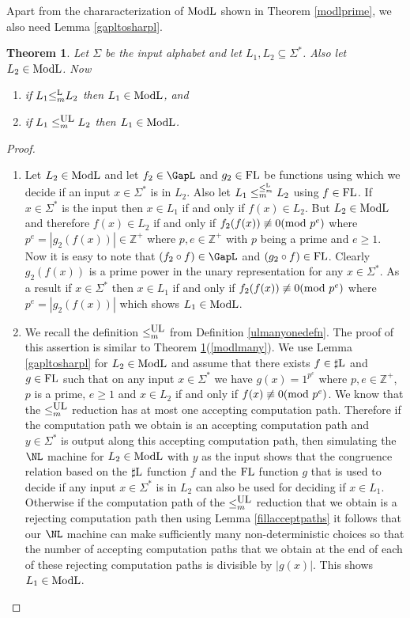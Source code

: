 \documentclass{amsbook}
\newtheorem{theorem}{Theorem}[chapter]
\theoremstyle{definition}
\theoremstyle{remark}
\numberwithin{section}{chapter}
\numberwithin{equation}{chapter}
\newcommand{\Lredn}{\leq^{\small{\rm L}}_m}
\newcommand{\ULredn}{\mbox{\small{\rm UL}}}
\newcommand{\sharpL}{\mbox{$\sharp$\rm L}}
\newcommand{\ModL}{\mbox{\rm ModL}}
\newcommand{\FL}{\mbox{\rm FL}}
\renewcommand{\mod}{\mbox{\textrm mod~}}
\newcommand{\Z}{\mathbb{Z}}
\begin{document}
Apart from the chararacterization of $\ModL$ shown in Theorem \ref{modlprime}, we also need Lemma \ref{gapltosharpl}.

\begin{theorem}\label{modlunconclos}
Let $\Sigma$ be the input alphabet and let $L_1,L_2\subseteq \Sigma ^{*}$. Also let $L_2\in\ModL$. Now 
\begin{enumerate}
\item\label{modlmany} if $L_1{\Lredn} L_2$ then $L_1\in\ModL$, and
\item\label{modlulmany} if $L_1\leq^{\ULredn}_mL_2$ then $L_1\in\ModL$.
\end{enumerate}
\end{theorem}
\begin{proof}
\begin{enumerate}
\item Let $L_2\in\ModL$ and let $f_2\in\GapL$ and $g_2\in\FL$ be functions using which we decide if an input $x\in\Sigma ^{*}$ is in $L_2$. Also let $L_1\leq ^{\Lredn}_mL_2$ using $f\in\FL$. If $x\in\Sigma^{*}$ is the input then $x\in L_1$ if and only if $f(x)\in L_2$. But $L_2\in\ModL$ and therefore $f(x)\in L_2$ if and only if $f_2(f(x))\not\equiv 0(\mod p^e)$ where $p^e=|g_2(f(x))|\in\Z^{+}$ where $p,e\in\Z^{+}$ with $p$ being a prime and $e\geq 1$. Now it is easy to note that $(f_2\circ f)\in\GapL$ and $(g_2\circ f)\in\FL$. Clearly $g_2(f(x))$ is a prime power in the unary representation for any $x\in\Sigma ^{*}$. As a result if $x\in\Sigma ^{*}$ then $x\in L_1$ if and only if $f_2(f(x))\not\equiv 0(\mod p^e)$ where $p^e=|g_2(f(x))|$ which shows $L_1\in\ModL$.

\item We recall the definition $\leq^{\ULredn}_m$ from Definition \ref{ulmanyonedefn}. The proof of this assertion is similar to Theorem \ref{modlunconclos}(\ref{modlmany}). We use Lemma \ref{gapltosharpl} for $L_2\in \ModL$ and assume that there exists $f\in\sharpL$ and $g\in\FL$ such that on any input $x\in\Sigma^{*}$ we have $g(x)=1^{p^e}$ where $p,e\in\Z^{+}$, $p$ is a prime, $e\geq 1$ and $x\in L_2$ if and only if $f(x)\not\equiv 0(\mod p^e)$. We know that the $\leq^{\ULredn}_m$ reduction has at most one accepting computation path. Therefore if the computation path we obtain is an accepting computation path and $y\in\Sigma^{*}$ is output along this accepting computation path, then simulating the $\NL$ machine for $L_2\in\ModL$ with $y$ as the input shows that the congruence relation based on the $\sharpL$ function $f$ and the $\FL$ function $g$ that is used to decide if any input $x\in\Sigma ^{*}$ is in $L_2$ can also be used for deciding if $x\in L_1$. Otherwise if the computation path of the $\leq^{\ULredn}_m$ reduction that we obtain is a rejecting computation path then using Lemma \ref{fillacceptpaths} it follows that our $\NL$ machine can make sufficiently many non-deterministic choices so that the number of accepting computation paths that we obtain at the end of each of these rejecting computation paths is divisible by $|g(x)|$. This shows $L_1\in\ModL$.
\end{enumerate}
\end{proof}
\end{document}
